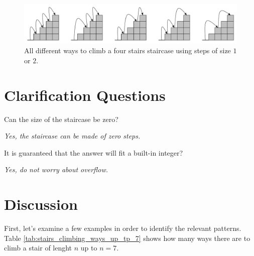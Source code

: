 \begin{figure}
	\centering
	\includegraphics[width=\textwidth]{sources/stairs_climbing/images/stairs4}
	\caption{All different ways to climb a four stairs staircase using steps of size $1$ or $2$.}
	\label{fig:stair_example_5}
\end{figure}

\section{Clarification Questions}

\begin{QandA}
	\item \begin{questionitem} \begin{question} Can the size of the staircase be zero?  \end{question} 	 
    \begin{answered}
		\textit{Yes, the staircase can be made of zero steps.}
	\end{answered} \end{questionitem}
	
	\item \begin{questionitem} \begin{question} It is guaranteed that the answer will fit a built-in integer?  \end{question} 	 
    \begin{answered}
		\textit{Yes, do not worry about overflow.}
	\end{answered} \end{questionitem}

\end{QandA}

\section{Discussion}
\label{stairs_climbing:sec:discussion}

First, let's examine a few examples in order to identify the relevant patterns. Table \ref{tab:stairs_climbing_ways_up_tp_7} shows  how many ways there are to climb a stair of lenght $n$ up to $n=7$.


